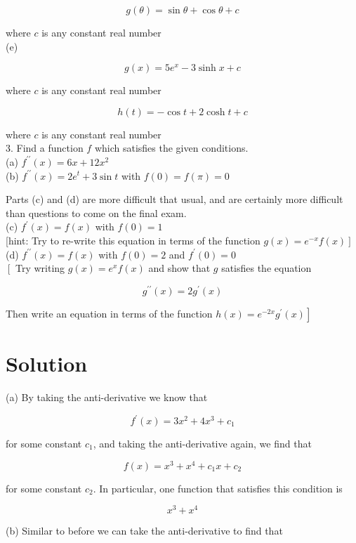 \documentclass[10pt]{article}
\begin{document}
$$
g(\theta)=\sin \theta+\cos \theta+c
$$

where $c$ is any constant real number\\
(e)

$$
g(x)=5 e^{x}-3 \sinh x+c
$$

where $c$ is any constant real number


\begin{equation*}
h(t)=-\cos t+2 \cosh t+c \tag{f}
\end{equation*}


where $c$ is any constant real number\\
3. Find a function $f$ which satisfies the given conditions.\\
(a) $f^{\prime \prime}(x)=6 x+12 x^{2}$\\
(b) $f^{\prime \prime}(x)=2 e^{t}+3 \sin t$ with $f(0)=f(\pi)=0$

Parts (c) and (d) are more difficult that usual, and are certainly more difficult than questions to come on the final exam.\\
(c) $f^{\prime}(x)=f(x)$ with $f(0)=1$\\[0pt]
[hint: Try to re-write this equation in terms of the function $\left.g(x)=e^{-x} f(x)\right]$\\
(d) $f^{\prime \prime}(x)=f(x)$ with $f(0)=2$ and $f^{\prime}(0)=0$\\
$\left[\right.$ Try writing $g(x)=e^{x} f(x)$ and show that $g$ satisfies the equation

$$
g^{\prime \prime}(x)=2 g^{\prime}(x)
$$

Then write an equation in terms of the function $\left.h(x)=e^{-2 x} g^{\prime}(x)\right]$

\section*{Solution}
(a) By taking the anti-derivative we know that

$$
f^{\prime}(x)=3 x^{2}+4 x^{3}+c_{1}
$$

for some constant $c_{1}$, and taking the anti-derivative again, we find that

$$
f(x)=x^{3}+x^{4}+c_{1} x+c_{2}
$$

for some constant $c_{2}$. In particular, one function that satisfies this condition is

$$
x^{3}+x^{4}
$$

(b) Similar to before we can take the anti-derivative to find that
\end{document}
